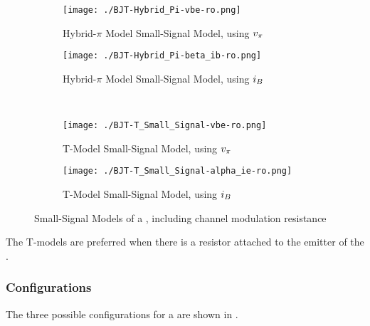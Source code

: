 \begin{figure}[h!tbp]
  \centering
  \begin{subfigure}{0.45\linewidth}
    \centering
    \texttt{[image: ./BJT-Hybrid\_Pi-vbe-ro.png]}
    \caption{Hybrid-$\pi$ Model Small-Signal Model, using $\ACVoltage{\pi}$ \parencite[p.~408]{sedraTextbook7}}
    \label{fig:BJT-Hybrid_Pi_Model-vbe-ro}
  \end{subfigure}
  \begin{subfigure}{0.45\linewidth}
    \centering
    \texttt{[image: ./BJT-Hybrid\_Pi-beta\_ib-ro.png]}
    \caption{Hybrid-$\pi$ Model Small-Signal Model, using $\ACCurrent{\Base}$ \parencite[p.~408]{sedraTextbook7}}
    \label{fig:BJT-Hybrid_Pi_Model-ib-ro}
  \end{subfigure}
  \\
  \begin{subfigure}{0.45\linewidth}
    \centering
    \texttt{[image: ./BJT-T\_Small\_Signal-vbe-ro.png]}
    \caption{T-Model Small-Signal Model, using $\ACVoltage{\pi}$ \parencite[p.~410]{sedraTextbook7}}
    \label{fig:BJT-T_Model-vpi-ro}
  \end{subfigure}
  \begin{subfigure}{0.45\linewidth}
    \centering
    \texttt{[image: ./BJT-T\_Small\_Signal-alpha\_ie-ro.png]}
    \caption{T-Model Small-Signal Model, using $\ACCurrent{\Base}$ \parencite[p.~410]{sedraTextbook7}}
    \label{fig:BJT-T_Model-ib-ro}
  \end{subfigure}
  \caption{Small-Signal Models of a , including channel modulation resistance}
  \label{fig:BJT-Small_Signal_Models-ro}
\end{figure}

\begin{remark*}
  The T-models are preferred when there is a resistor attached to the emitter of the .
\end{remark*}

\subsubsection{Configurations}\label{subsubsec:BJT_Configurations}
The three possible configurations for a  are shown in .

